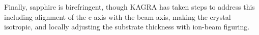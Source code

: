Finally, sapphire is birefringent, though \ac{KAGRA} has taken steps to address this including alignment of the c-axis with the beam axis, making the crystal isotropic, and locally adjusting the substrate thickness with ion-beam figuring.  





